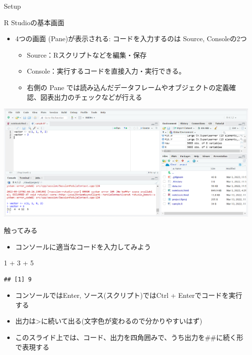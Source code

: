 \documentclass[
  ignorenonframetext,
]{beamer}
\newenvironment{Shaded}{\begin{snugshade}}{\end{snugshade}}
\newcommand{\DecValTok}[1]{\textcolor[rgb]{0.00,0.00,0.81}{#1}}
\newcommand{\SpecialCharTok}[1]{\textcolor[rgb]{0.00,0.00,0.00}{#1}}
\providecommand{\tightlist}{%
  \setlength{\itemsep}{0pt}\setlength{\parskip}{0pt}}
\begin{document}
\begin{frame}[fragile]{Setup}
\begin{block}{R Studioの基本画面}
\protect\hypertarget{r-studioux306eux57faux672cux753bux9762}{}
\begin{itemize}
\tightlist
\item
  4つの画面 (Pane)が表示される: コードを入力するのは Source,
  Consoleの2つ

  \begin{itemize}
  \tightlist
  \item
    Source：Rスクリプトなどを編集・保存
  \item
    Console：実行するコードを直接入力・実行できる。
  \item
    右側の Pane
    では読み込んだデータフレームやオブジェクトの定義確認、図表出力のチェックなどが行える
  \end{itemize}
\end{itemize}

\begin{center}\includegraphics[width=0.77\linewidth]{figs/rstudio_appearance} \end{center}
\end{block}

\begin{block}{触ってみる}
\protect\hypertarget{ux89e6ux3063ux3066ux307fux308b}{}
\begin{itemize}
\tightlist
\item
  コンソールに適当なコードを入力してみよう
\end{itemize}

\begin{Shaded}
\begin{Highlighting}[]
\DecValTok{1} \SpecialCharTok{+} \DecValTok{3} \SpecialCharTok{+} \DecValTok{5}
\end{Highlighting}
\end{Shaded}

\begin{verbatim}
## [1] 9
\end{verbatim}

\begin{itemize}
\tightlist
\item
  コンソールではEnter, ソース(スクリプト)ではCtrl +
  Enterでコードを実行する
\item
  出力は\textgreater に続いて出る(文字色が変わるので分かりやすいはず)
\item
  このスライド上では、コード、出力を四角囲みで、うち出力を\#\#に続く形で表現する
\end{itemize}
\end{block}
\end{frame}
\end{document}
